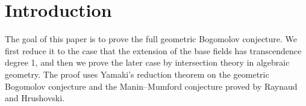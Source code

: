 \documentclass[12pt]{amsart}
\begin{document}
\author{Junyi Xie}


\address{Univ Rennes, CNRS, IRMAR - UMR 6625, F-35000 Rennes, France}



\author{Xinyi Yuan}

\address{BICMR, Peking University, Haidian District, Beijing 100871, China}




\date{\today}

%


\maketitle


\begin{abstract}
We give a proof of the full geometric Bogomolov conjecture.
\end{abstract}

\tableofcontents





\section{Introduction}
The goal of this paper is to prove the full geometric Bogomolov conjecture.
We first reduce it to the case that the extension of the base fields has transcendence degree 1, and then we prove the later case by intersection theory in algebraic geometry. 
The proof uses Yamaki's reduction theorem on the geometric Bogomolov conjecture and the Manin--Mumford conjecture proved by Raynaud and Hrushovski.  
\end{document}
